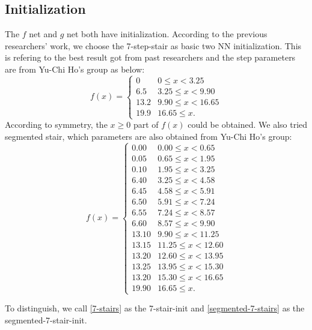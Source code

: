 \documentclass[conference,compsoc]{IEEEtran}
\begin{document}
\subsection{Initialization}
The $f$ net and $g$ net both have initialization. According to the previous researchers' work, we choose the 7-step-stair as basic two NN initialization. This is refering to the best result got from past researchers and the step parameters are from Yu-Chi Ho's group\cite{liu2019variance} as below:
\begin{equation}\label{7-stairs}
    f(x)=
    \begin{cases}
          0 & 0 \leq x < 3.25 \\
          6.5 & 3.25 \leq x < 9.90\\
          13.2 & 9.90 \leq x<16.65\\
          19.9 & 16.65 \leq x.
  \end{cases}
\end{equation}
According to symmetry, the $x \geq 0$ part of $f(x)$ could be obtained. We also tried segmented stair, which parameters are also obtained from Yu-Chi Ho's group\cite{lee2001witsenhausen}:
\begin{equation}\label{segmented-7-stairs}
  f(x)=
  \begin{cases}
        0.00 & 0.00 \leq x < 0.65\\
        0.05 & 0.65 \leq x < 1.95\\
        0.10 & 1.95 \leq x< 3.25\\
        6.40 & 3.25 \leq x< 4.58\\
        6.45 & 4.58 \leq x< 5.91\\
        6.50 & 5.91 \leq x< 7.24\\
        6.55 & 7.24 \leq x< 8.57\\
        6.60 & 8.57 \leq x< 9.90\\
        13.10 & 9.90 \leq x< 11.25\\
        13.15 & 11.25 \leq x< 12.60\\
        13.20 & 12.60 \leq x< 13.95\\
        13.25 & 13.95 \leq x< 15.30\\
        13.20 & 15.30 \leq x< 16.65\\
        19.90 & 16.65 \leq x.
\end{cases}
\end{equation}

To distinguish, we call \eqref{7-stairs} as the 7-stair-init and \eqref{segmented-7-stairs} as the segmented-7-stair-init.
\end{document}
